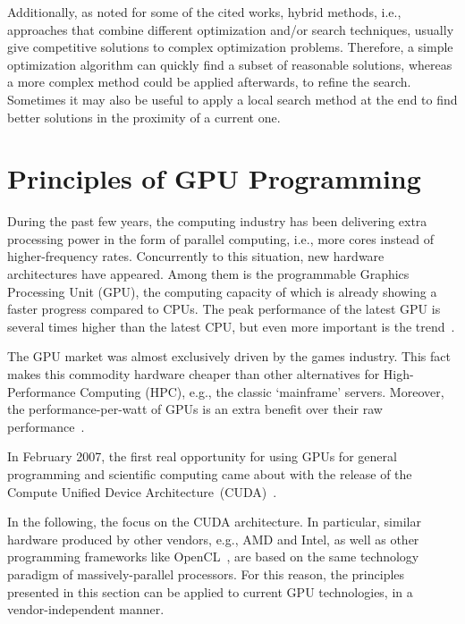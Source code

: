 Additionally, as noted for some of the cited works, hybrid methods,
i.e., approaches that combine different optimization and/or search
techniques, usually give competitive solutions to complex optimization
problems. Therefore, a simple optimization algorithm can quickly find
a subset of reasonable solutions, whereas a more complex method could
be applied afterwards, to refine the search. Sometimes it may also
be useful to apply a local search method at the end to find better
solutions in the proximity of a current one.


\chapter{Principles of GPU Programming \label{chap:02-Principles_of_GPU_programming}}

During the past few years, the computing industry has been delivering
extra processing power in the form of parallel computing, i.e., more
cores instead of higher-frequency rates. Concurrently to this situation,
new hardware architectures have appeared. Among them is the programmable
Graphics Processing Unit (GPU),
the computing capacity of which is already showing a faster progress
compared to CPUs. The peak performance of the latest GPU is several
times higher than the latest CPU, but even more important is the trend~\cite{Cruz-How_to_obtain_efficient_GPU_kernels:2011}.

The GPU market was almost exclusively driven by the games industry.
This fact makes this commodity hardware cheaper than other alternatives
for High-Performance Computing (HPC),
e.g., the classic \textquoteleft{}mainframe\textquoteright{} servers.
Moreover, the performance-per-watt of GPUs is an extra benefit over
their raw performance~\cite{Cruz-How_to_obtain_efficient_GPU_kernels:2011}.

In February 2007, the first real opportunity for using GPUs for general
programming and scientific computing came about with the release of
the Compute Unified Device Architecture~(CUDA)~\cite{CUDA}.

In the following, the focus on the CUDA architecture. In particular,
similar hardware produced by other vendors, e.g., AMD and Intel, as
well as other programming frameworks like OpenCL~\cite{Stone_OpenCL.A.parallel.programming.standard:2010},
are based on the same technology paradigm of massively-parallel processors.
For this reason, the principles presented in this section can be applied
to current GPU technologies, in a vendor-independent manner.


